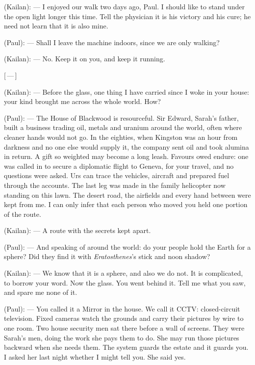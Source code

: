 \begin{room}

(Kailan): --- I enjoyed our walk two days ago, Paul. I should like to stand under the open light longer this time. Tell the physician it is his victory and his cure; he need not learn that it is also mine.

(Paul): --- Shall I leave the machine indoors, since we are only walking?

(Kailan): --- No. Keep it on you, and keep it running.

\centerline{[\,---\,]}

(Kailan): --- Before the glass, one thing I have carried since I woke in your house: your kind brought me across the whole world. How?

(Paul): --- The House of Blackwood is resourceful. Sir Edward, Sarah’s father, built a business trading oil, metals and uranium around the world, often where cleaner hands would not go. In the eighties, when Kingston was an hour from darkness and no one else would supply it, the company sent oil and took alumina in return. A gift so weighted may become a long leash. Favours owed endure: one was called in to secure a diplomatic flight to Geneva, for your travel, and no questions were asked. Urs can trace the vehicles, aircraft and prepared fuel through the accounts. The last leg was made in the family helicopter now standing on this lawn. The desert road, the airfields and every hand between were kept from me. I can only infer that each person who moved you held one portion of the route.

(Kailan): --- A route with the secrets kept apart. 

(Paul): --- And speaking of around the world: do your people hold the Earth for a sphere? Did they find it with \textit{Eratosthenes}'s stick and noon shadow?

(Kailan): --- We know that it is a sphere, and also we do not. It is complicated, to borrow your word. Now the glass. You went behind it. Tell me what you saw, and spare me none of it.

(Paul): --- You called it a Mirror in the house. We call it CCTV: closed-circuit television. Fixed cameras watch the grounds and carry their pictures by wire to one room. Two house security men sat there before a wall of screens. They were Sarah's men, doing the work she pays them to do. She may run those pictures backward when she needs them. The system guards the estate and it guards you. I asked her last night whether I might tell you. She said yes.


\end{room}
